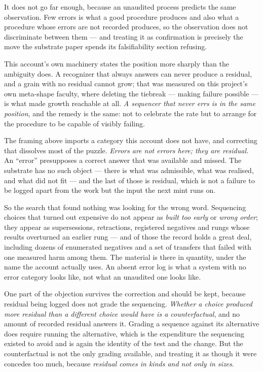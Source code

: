 \documentclass[11pt,a4paper]{article}
\theoremstyle{remark}\newtheorem{remark}[definition]{Remark}
\begin{document}
It does not go far enough, because an unaudited process predicts the same observation. Few errors is
what a good procedure produces and also what a procedure whose errors are not recorded produces, so
the observation does not discriminate between them --- and treating it as confirmation is precisely the
move the substrate paper spends its falsifiability section refusing.

This account's own machinery states the position more sharply than the ambiguity does. A recognizer
that always answers can never produce a residual, and a grain with no residual cannot grow; that was
measured on this project's own meta-shape faculty, where deleting the tiebreak --- making failure
possible --- is what made growth reachable at all. \emph{A sequencer that never errs is in the same
position}, and the remedy is the same: not to celebrate the rate but to arrange for the procedure to be
capable of visibly failing.

The framing above imports a category this account does not have, and correcting that dissolves most of
the puzzle. \emph{Errors are not errors here; they are residual.} An ``error'' presupposes a correct
answer that was available and missed. The substrate has no such object --- there is what was admissible,
what was realised, and what did not fit --- and the last of those is residual, which is not a failure to
be logged apart from the work but the input the next mint runs on.

So the search that found nothing was looking for the wrong word. Sequencing choices that turned out
expensive do not appear as \emph{built too early} or \emph{wrong order}; they appear as supersessions,
retractions, registered negatives and rungs whose results overturned an earlier rung --- and of those
the record holds a great deal, including dozens of enumerated negatives and a set of transfers that
failed with one measured harm among them. The material is there in quantity, under the name the account
actually uses. An absent error log is what a system with no error category looks like, not what an
unaudited one looks like.

One part of the objection survives the correction and should be kept, because residual being logged
does not grade the sequencing. \emph{Whether a choice produced more residual than a different choice
would have is a counterfactual}, and no amount of recorded residual answers it. Grading a sequence against its alternative does require
running the alternative, which is the expenditure the sequencing existed to avoid and is again the
identity of the test and the change. But the counterfactual is not the only grading available, and
treating it as though it were concedes too much, because \emph{residual comes in kinds and not only in
sizes}.
\end{document}

